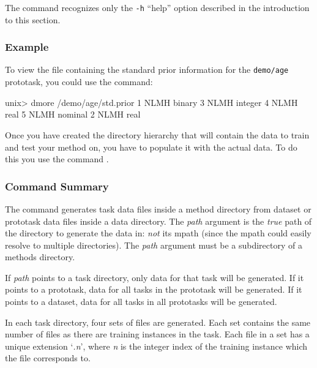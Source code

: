 The \dmore{} command recognizes only the \texttt{-h} ``help'' option
described in the introduction to this section.

\subsubsection*{Example}

To view the file containing the standard prior information for the
\texttt{demo/age} prototask, you could use the command:
\begin{Session}
unix> dmore /demo/age/std.prior
1 NLMH binary
3 NLMH integer
4 NLMH real
5 NLMH nominal
2 NLMH real
\end{Session}

%
%


Once you have created the directory hierarchy that will contain the
data to train and test your method on, you have to populate it with
the actual data.  To do this you use the command \mgendata.

\subsubsection*{Command Summary}

The \mgendata{} command generates task data files inside a \delve{}
method directory from dataset or prototask data files inside a
\delve{} data directory.  The \textit{path} argument is the \emph{true}
path of the directory to generate the data in: \emph{not} its mpath
(since the mpath could easily resolve to multiple directories).  The
\textit{path} argument must be a subdirectory of a \delve{} methods directory.

If \textit{path} points to a task directory, only data for that task
will be generated. If it points to a prototask, data for all tasks in
the prototask will be generated.  If it points to a dataset, data for
all tasks in all prototasks will be generated.

In each task directory, four sets of files are generated.  Each set
contains the same number of files as there are training instances in
the task.  Each file in a set has a unique extension `\textit{.n}',
where \textit{n} is the integer index of the training instance which
the file corresponds to.\vspace{-5pt}

